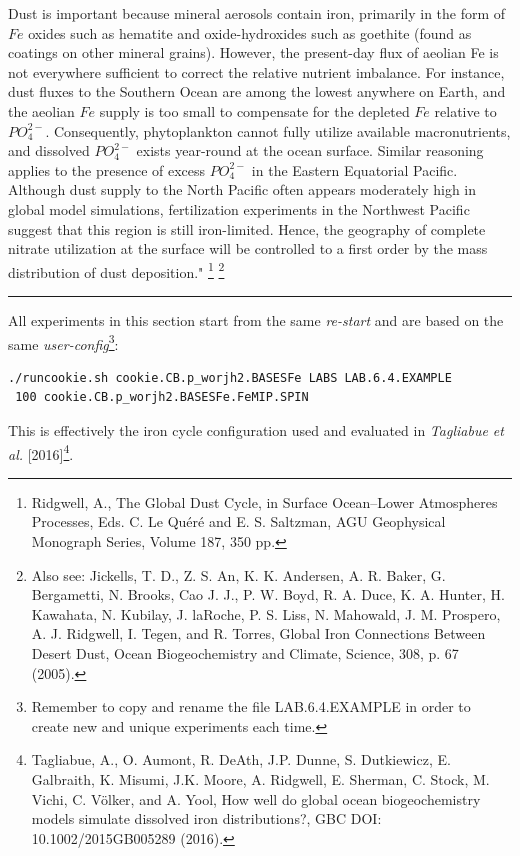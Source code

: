 Dust is important because mineral aerosols contain iron, primarily in the form of \(Fe\) oxides such as hematite and oxide-hydroxides such as goethite (found as coatings on other mineral grains). However, the present-day flux of aeolian Fe is not everywhere sufficient to correct the relative nutrient imbalance. For instance, dust fluxes to the Southern Ocean are among the lowest anywhere on Earth, and the aeolian \(Fe\) supply is too small to compensate for the depleted \(Fe\) relative to \(PO^{2-}_{4}\). Consequently, phytoplankton cannot fully utilize available macronutrients, and dissolved \(PO^{2-}_{4}\) exists year-round at the ocean surface. Similar reasoning applies to the presence of excess \(PO^{2-}_{4}\) in the Eastern Equatorial Pacific. Although dust supply to the North Pacific often appears moderately high in global model simulations, fertilization experiments in the Northwest Pacific suggest that this region is still iron-limited. Hence, the geography of complete nitrate utilization at the surface will be controlled to a first order by the mass distribution of dust deposition." \footnote{Ridgwell, A., The Global Dust Cycle, in Surface Ocean--Lower Atmospheres Processes, Eds. C. Le Quéré and E. S. Saltzman, AGU Geophysical Monograph Series, Volume 187, 350 pp.} \footnote{Also see: Jickells, T. D., Z. S. An, K. K. Andersen, A. R. Baker, G. Bergametti, N. Brooks, Cao J. J., P. W. Boyd, R. A. Duce, K. A. Hunter, H. Kawahata, N. Kubilay, J. laRoche, P. S. Liss, N. Mahowald, J. M. Prospero, A. J. Ridgwell, I. Tegen, and R. Torres, Global Iron Connections Between Desert Dust, Ocean Biogeochemistry and Climate, Science, 308, p. 67 (2005).}

\vspace{1mm} \noindent\rule{4cm}{0.1mm} \vspace{2mm}

\noindent All experiments in this section start from the same \textit{re-start} and are based on the same \textit{user-config}\footnote{Remember to copy and rename the file \textsf{\footnotesize LAB.6.4.EXAMPLE} in order to create new and unique experiments each time.}:
\vspace{-2mm}\small\begin{verbatim}
./runcookie.sh cookie.CB.p_worjh2.BASESFe LABS LAB.6.4.EXAMPLE
 100 cookie.CB.p_worjh2.BASESFe.FeMIP.SPIN
\end{verbatim}\normalsize\vspace{-1mm}
This is effectively the iron cycle configuration used and evaluated in \textit{Tagliabue et al.} [2016]\footnote{Tagliabue, A., O. Aumont, R. DeAth, J.P. Dunne, S. Dutkiewicz, E. Galbraith, K. Misumi, J.K. Moore, A. Ridgwell, E. Sherman, C. Stock, M. Vichi, C. Völker, and A. Yool, How well do global ocean biogeochemistry models simulate dissolved iron distributions?, GBC DOI: 10.1002/2015GB005289 (2016).}.

